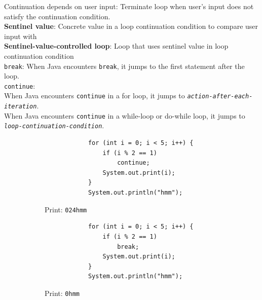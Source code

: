 \documentclass{article}
\begin{document}
Continuation depends on user input: Terminate loop when user's input does not satisfy the continuation condition.\\
\textbf{Sentinel value}: Concrete value in a loop continuation condition to compare user input with\\
\textbf{Sentinel-value-controlled loop}: Loop that uses sentinel value in loop continuation condition\\
\texttt{break}: When Java encounters \texttt{break}, it jumps to the first statement after the loop.\\
\texttt{continue}:\\
When Java encounters \texttt{continue} in a for loop, it jumps to \texttt{\textit{action-after-each-iteration}}.\\
When Java encounters \texttt{continue} in a while-loop or do-while loop, it jumps to \texttt{\textit{loop-continuation-condition}}.

\begin{figure}[h]
	\centering
	\begin{subfigure}{.45\textwidth}
		\begin{verbatim}
			for (int i = 0; i < 5; i++) {
			    if (i % 2 == 1)
			        continue;
			    System.out.print(i);
			}
			System.out.println("hmm");
		\end{verbatim}
		Print: \texttt{024hmm}
	\end{subfigure}
	\begin{subfigure}{.45\textwidth}
		\begin{verbatim}
			for (int i = 0; i < 5; i++) {
			    if (i % 2 == 1)
			        break;
			    System.out.print(i);
			}
			System.out.println("hmm");
		\end{verbatim}
		Print: \texttt{0hmm}
	\end{subfigure}
\end{figure}
\newpage

\null
\newpage
\end{document}

